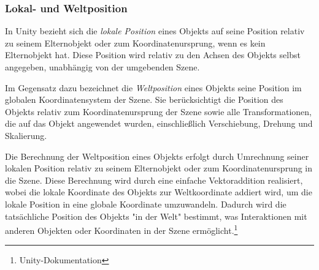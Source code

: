 \begin{itemize}
\subsubsection*{Lokal- und Weltposition}
In Unity bezieht sich die \textit{lokale Position} eines Objekts auf seine Position relativ zu seinem Elternobjekt oder
zum Koordinatenursprung, wenn es kein Elternobjekt hat. Diese Position wird relativ zu den Achsen des Objekts selbst
angegeben, unabhängig von der umgebenden Szene.

Im Gegensatz dazu bezeichnet die \textit{Weltposition} eines Objekts seine Position im globalen Koordinatensystem der
Szene. Sie berücksichtigt die Position des Objekts relativ zum Koordinatenursprung der Szene sowie alle Transformationen,
die auf das Objekt angewendet wurden, einschließlich Verschiebung, Drehung und Skalierung.

Die Berechnung der Weltposition eines Objekts erfolgt durch Umrechnung seiner lokalen Position relativ zu seinem Elternobjekt
oder zum Koordinatenursprung in die Szene. Diese Berechnung wird durch eine einfache Vektoraddition realisiert, wobei
die lokale Koordinate des Objekts zur Weltkoordinate addiert wird, um die lokale Position in eine globale Koordinate
umzuwandeln. Dadurch wird die tatsächliche Position des Objekts "in der Welt" bestimmt, was Interaktionen mit anderen
Objekten oder Koordinaten in der Szene ermöglicht.\footnote{Unity-Dokumentation\cite{Lokal- und Weltposition}}


\end{itemize}
